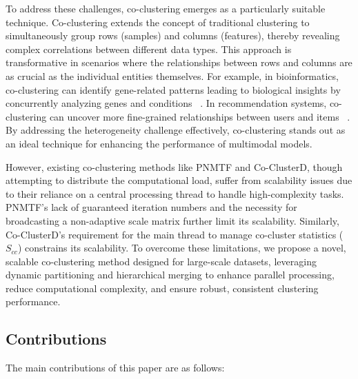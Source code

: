 \documentclass[journal]{IEEEtran}
\renewcommand{\cite}[1]{~\autocite{#1}}
\begin{document}
To address these challenges, co-clustering emerges as a particularly suitable technique. Co-clustering extends the concept of traditional clustering to simultaneously group rows (samples) and columns (features), thereby revealing complex correlations between different data types. This approach is transformative in scenarios where the relationships between rows and columns are as crucial as the individual entities themselves. For example, in bioinformatics, co-clustering can identify gene-related patterns leading to biological insights by concurrently analyzing genes and conditions \cite{higham2007SpectralClusteringIts, kluger2003SpectralBiclusteringMicroarray, madeira2004BiclusteringAlgorithmsBiological, zhao2012BiclusteringAnalysisPattern, golchev2015BiclusteringAnalysisGene}. In recommendation systems, co-clustering can uncover more fine-grained relationships between users and items \cite{dhillon2007WeightedGraphCuts, chen2023ParallelNonNegativeMatrix, bouchareb2019ModelBasedCoclustering}. By addressing the heterogeneity challenge effectively, co-clustering stands out as an ideal technique for enhancing the performance of multimodal models.

However, existing co-clustering methods like PNMTF and Co-ClusterD, though attempting to distribute the computational load, suffer from scalability issues due to their reliance on a central processing thread to handle high-complexity tasks. PNMTF's lack of guaranteed iteration numbers and the necessity for broadcasting a non-adaptive scale matrix further limit its scalability. Similarly, Co-ClusterD's requirement for the main thread to manage co-cluster statistics ($S_{cc}$) constrains its scalability. To overcome these limitations, we propose a novel, scalable co-clustering method designed for large-scale datasets, leveraging dynamic partitioning and hierarchical merging to enhance parallel processing, reduce computational complexity, and ensure robust, consistent clustering performance.

\subsection{Contributions}

The main contributions of this paper are as follows:
\end{document}
